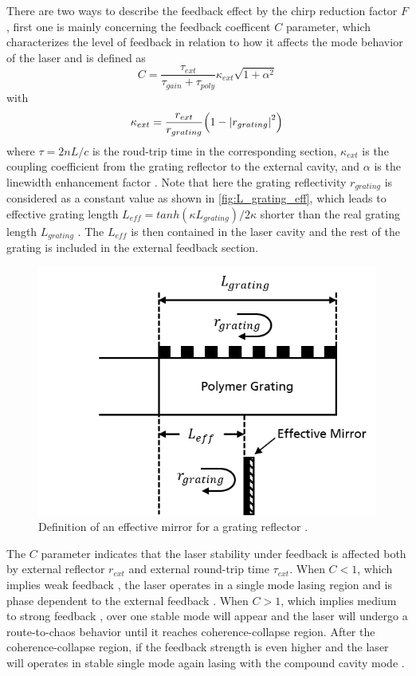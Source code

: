 There are two ways to describe the feedback effect by the chirp reduction factor $F$, first one is mainly concerning the feedback coefficent $C$ parameter, which characterizes the level of feedback in relation to how it affects the mode behavior of the laser and is defined as \cite{petermann2012laser}
\begin{equation}
    C=\frac{\tau_{ext}}{\tau_{gain}+\tau_{poly}}\kappa_{ext}\sqrt{1+\alpha^2}
    \label{eq:C}
\end{equation}
with
\begin{equation}
    \kappa_{ext}=\frac{r_{ext}}{r_{grating}}\qty(1-\abs{r_{grating}}^2)
    \label{eq:kappa_ext}
\end{equation}
where $\tau=2nL/c$ is the roud-trip time in the corresponding section, $\kappa_{ext}$ is the coupling coefficient from the grating reflector to the external cavity, and $\alpha$ is the linewidth enhancement factor \cite{henry1982theory}. Note that here the grating reflectivity $r_{grating}$ is considered as a constant value as shown in \autoref{fig:L_grating_eff}, which leads to effective grating length $L_{eff}=tanh(\kappa L_{grating})/2\kappa$ shorter than the real grating length $L_{grating}$ \cite{kuznetsov1988theory}. The $L_{eff}$ is then contained in the laser cavity and the rest of the grating is included in the external feedback section.

\begin{figure}[ht]
    \centering
    \includegraphics[width=.6\linewidth]{figures/L_grating_eff.png}
    \caption{Definition of an effective mirror for a grating reflector \cite{coldren2012diode}.}
    \label{fig:L_grating_eff}
\end{figure}

The $C$ parameter indicates that the laser stability under feedback is affected both by external reflector $r_{ext}$ and external round-trip time $\tau_{ext}$. When $C<1$, which implies weak feedback \cite{petermann2012laser,ohtsubo2012semiconductor}, the laser operates in a single mode lasing region and is phase dependent to the external feedback \cite{petermann2012laser, ohtsubo2012semiconductor}. When $C>1$, which implies medium to strong feedback \cite{petermann2012laser,ohtsubo2012semiconductor}, over one stable mode will appear and the laser will undergo a route-to-chaos behavior until it reaches coherence-collapse \cite{lenstra1985coherence} region. After the coherence-collapse region, if the feedback strength is even higher and the laser will operates in stable single mode again lasing with the compound cavity mode \cite{donati2013diagram}.

